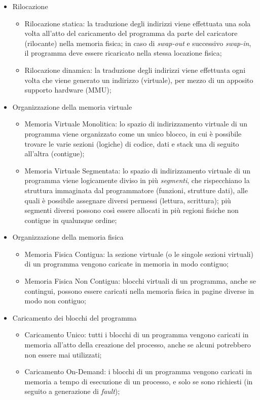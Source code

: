 \documentclass[12pt,a4paper]{article}
\begin{document}
\begin{itemize}
  \item Rilocazione
    \begin{itemize}
      \item Rilocazione statica: la traduzione degli indirizzi viene
        effettuata una sola volta all'atto del caricamento del programma
        da parte del caricatore (rilocante) nella memoria fisica;
        in caso di \emph{swap-out} e successivo \emph{swap-in}, il
        programma deve essere ricaricato nella stessa locazione fisica;
      \item Rilocazione dinamica: la traduzione degli indirizzi viene
        effettuata ogni volta che viene generato un indirizzo
        (virtuale), per mezzo di un apposito supporto hardware (MMU);
    \end{itemize}
  \item Organizzazione della memoria virtuale
    \begin{itemize}
      \item Memoria Virtuale Monolitica: lo spazio di indirizzamento
        virtuale di un programma viene organizzato come un unico blocco,
        in cui è possibile trovare le varie sezioni (logiche) di codice,
        dati e stack una di seguito all'altra (contigue);
      \item Memoria Virtuale Segmentata: lo spazio di indirizzamento
        virtuale di un programma viene logicamente diviso in più
        \emph{segmenti}, che rispecchiano la struttura immaginata dal
        programmatore (funzioni, strutture dati), alle quali è possibile
        assegnare diversi permessi (lettura, scrittura); più segmenti
        diversi possono così essere allocati in più regioni fisiche non
        contigue in qualunque ordine;
    \end{itemize}
  \item Organizzazione della memoria fisica
    \begin{itemize}
      \item Memoria Fisica Contigua: la sezione virtuale (o le singole
        sezioni virtuali) di un programma vengono caricate in memoria in
        modo contiguo;
      \item Memoria Fisica Non Contigua: blocchi virtuali di un
        programma, anche se contingui, possono essere caricati nella
        memoria fisica in pagine diverse in modo non contiguo;
    \end{itemize}
  \item Caricamento dei blocchi del programma
    \begin{itemize}
      \item Caricamento Unico: tutti i blocchi di un programma vengono
        caricati in memoria all'atto della creazione del processo, anche
        se alcuni potrebbero non essere mai utilizzati;
      \item Caricamento On-Demand: i blocchi di un programma vengono
        caricati in memoria a tempo di esecuzione di un processo, e solo
        se sono richiesti (in seguito a generazione di \emph{fault});
      \end{itemize}
\end{itemize}
\end{document}
